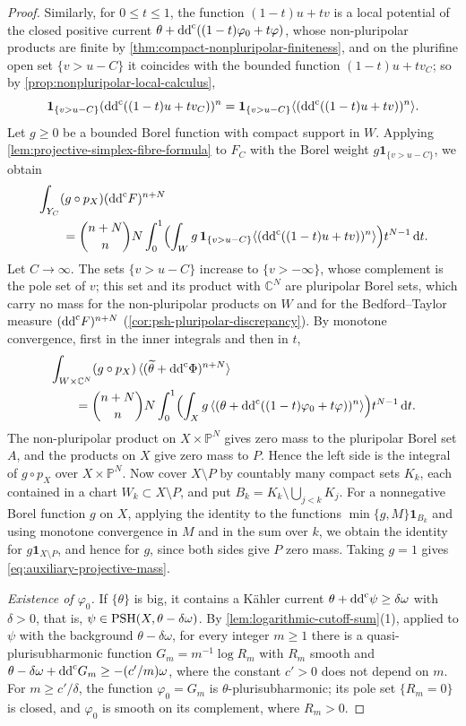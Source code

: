 \begin{proof}
Similarly, for $0\leq t\leq1$, the function $(1-t)u+tv$ is a local potential of the closed positive current $\theta+\mathrm{dd}^{\mathrm{c}}((1-t)\varphi_0+t\varphi)$, whose non-pluripolar products are finite by \cref{thm:compact-nonpluripolar-finiteness}, and on the plurifine open set $\{v>u-C\}$ it coincides with the bounded function $(1-t)u+tv_C$; so by \cref{prop:nonpluripolar-local-calculus},
\[
 \mathbf1_{\{v>u-C\}}(\mathrm{dd}^{\mathrm{c}}((1-t)u+tv_C))^n=\mathbf1_{\{v>u-C\}}\langle(\mathrm{dd}^{\mathrm{c}}((1-t)u+tv))^n\rangle.
\]
Let $g\geq0$ be a bounded Borel function with compact support in $W$. Applying \cref{lem:projective-simplex-fibre-formula} to $F_C$ with the Borel weight $g\mathbf1_{\{v>u-C\}}$, we obtain
\[
 \begin{aligned}
 &\int_{Y_C}(g\circ p_X)(\mathrm{dd}^{\mathrm{c}} F)^{n+N}\\
 &\qquad=\binom{n+N}{n}N\int_0^1\Bigl(\int_Wg\,\mathbf1_{\{v>u-C\}}\langle(\mathrm{dd}^{\mathrm{c}}((1-t)u+tv))^n\rangle\Bigr)t^{N-1}\,\mathrm dt.
 \end{aligned}
\]
Let $C\to\infty$. The sets $\{v>u-C\}$ increase to $\{v>-\infty\}$, whose complement is the pole set of $v$; this set and its product with $\mathbb C^N$ are pluripolar Borel sets, which carry no mass for the non-pluripolar products on $W$ and for the Bedford--Taylor measure $(\mathrm{dd}^{\mathrm{c}} F)^{n+N}$ (\cref{cor:psh-pluripolar-discrepancy}). By monotone convergence, first in the inner integrals and then in $t$,
\[
 \begin{aligned}
 &\int_{W\times\mathbb C^N}(g\circ p_X)\,\langle(\widetilde\theta+\mathrm{dd}^{\mathrm{c}}\Phi)^{n+N}\rangle\\
 &\qquad=\binom{n+N}{n}N\int_0^1\Bigl(\int_Xg\,\langle(\theta+\mathrm{dd}^{\mathrm{c}}((1-t)\varphi_0+t\varphi))^n\rangle\Bigr)t^{N-1}\,\mathrm dt.
 \end{aligned}
\]
The non-pluripolar product on $X\times\mathbb P^N$ gives zero mass to the pluripolar Borel set $A$, and the products on $X$ give zero mass to $P$. Hence the left side is the integral of $g\circ p_X$ over $X\times\mathbb P^N$. Now cover $X\setminus P$ by countably many compact sets $K_k$, each contained in a chart $W_k\subset X\setminus P$, and put $B_k=K_k\setminus\bigcup_{j<k}K_j$. For a nonnegative Borel function $g$ on $X$, applying the identity to the functions $\min\{g,M\}\mathbf1_{B_k}$ and using monotone convergence in $M$ and in the sum over $k$, we obtain the identity for $g\mathbf1_{X\setminus P}$, and hence for $g$, since both sides give $P$ zero mass. Taking $g=1$ gives \eqref{eq:auxiliary-projective-mass}.

\emph{Existence of $\varphi_0$.} If $\{\theta\}$ is big, it contains a K\"ahler current $\theta+\mathrm{dd}^{\mathrm{c}}\psi\geq\delta\omega$ with $\delta>0$, that is, $\psi\in\mathrm{PSH}(X,\theta-\delta\omega)$. By \cref{lem:logarithmic-cutoff-sum}(1), applied to $\psi$ with the background $\theta-\delta\omega$, for every integer $m\geq1$ there is a quasi-plurisubharmonic function $G_m=m^{-1}\log R_m$ with $R_m$ smooth and $\theta-\delta\omega+\mathrm{dd}^{\mathrm{c}} G_m\geq-(c'/m)\omega$, where the constant $c'>0$ does not depend on $m$. For $m\geq c'/\delta$, the function $\varphi_0=G_m$ is $\theta$-plurisubharmonic; its pole set $\{R_m=0\}$ is closed, and $\varphi_0$ is smooth on its complement, where $R_m>0$.
\end{proof}

